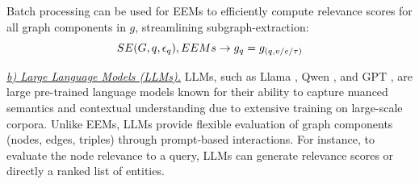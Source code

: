 {\begin{itemize}[leftmargin=10pt]
\end{itemize}

Batch processing can be used for EEMs to efficiently compute relevance scores for all graph components in \( g\), streamlining subgraph-extraction:
\begin{equation*}
\small
\ShortPreRetrieval(G, q, \epsilon_q), EEMs \rightarrow  %
g_q= g_{(q, v/e/\tau)}
\end{equation*}




{\it \underline{b) Large Language Models (LLMs).}}
LLMs, such as Llama {\cite{llama,llama2,llama3}} , Qwen  {\cite{qwen2}}, and GPT  {\cite{ref:gpt3,ref:gpt4}}, are large pre-trained language models known for their ability to capture nuanced semantics and contextual understanding due to extensive training on large-scale corpora. Unlike EEMs, LLMs provide flexible evaluation of graph components (nodes, edges, triples) through prompt-based interactions.
For instance, to evaluate the node relevance to a query,  LLMs can generate relevance scores or directly a ranked list of entities. 
}
